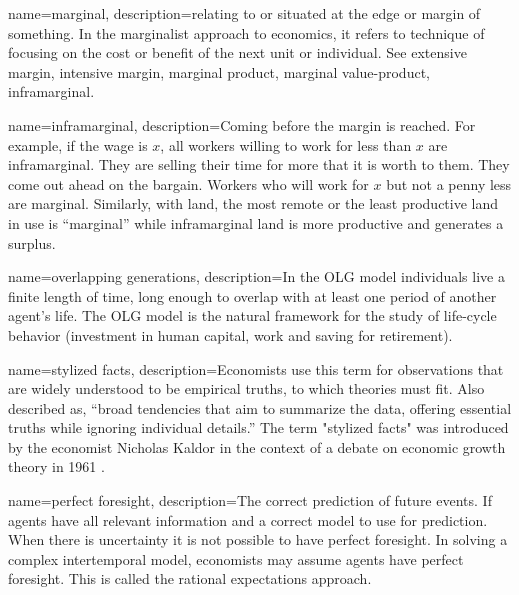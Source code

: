 

{
name=marginal,
description={relating to or situated at the edge or margin of something. In the marginalist approach to economics, it  refers to technique of focusing on the cost or benefit of the next unit or individual. See \gls{extensive margin}, \gls{intensive margin}, \gls{marginal product}, \gls{marginal value-product}, \gls{inframarginal}.}
}

{
name=inframarginal,
description={Coming before the margin is reached. For example, if the wage is $x$, all workers willing to work for less than $x$ are inframarginal. They are selling their time for more that it is worth to them. They come out ahead on the bargain. Workers who will work for $x$ but not a penny less are marginal. Similarly, with land, the most remote or the least productive land in use is ``marginal'' while  inframarginal land is more productive and generates a \gls{surplus}.}
}

{
name=overlapping generations,
description={In the \gls{OLG} model individuals live a finite length of time, long enough to overlap with at least one period of another agent's life. The OLG model is the natural framework for the study of life-cycle behavior (investment in human capital, work and saving for retirement).}
}

{
name=stylized facts,
description={Economists use this term for observations that are widely understood to be empirical truths, to which theories must fit.  Also described as, ``broad tendencies that aim to summarize the data, offering essential truths while ignoring individual details.'' The term "stylized facts" was introduced by the economist Nicholas Kaldor in the context of a debate on economic growth theory in 1961 \cite{kaldorCapitalAccumulationEconomic1961}.}
}

{
name=perfect foresight,
description={The correct prediction of future events. If agents have  all relevant information and  a correct model to use for prediction. When there is uncertainty it is not possible to have perfect foresight. In solving a complex intertemporal model, economists may assume agents have perfect foresight. This is called the rational expectations approach.}
}

